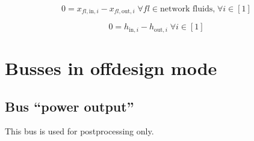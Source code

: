 \begin{equation}
\label{eq:Valve_fluid_constraints}
0=x_{fl\mathrm{,in,}i}-x_{fl\mathrm{,out,}i}\;\forall fl \in\text{network fluids,}\; \forall i \in [1]
\end{equation}

\begin{equation}
\label{eq:Valve_enthalpy_equality_constraints}
0=h_{\mathrm{in,}i}-h_{\mathrm{out,}i}\; \forall i \in [1]
\end{equation}


\section{Busses in offdesign mode}

\subsection{Bus ``power output''}

This bus is used for postprocessing only.

